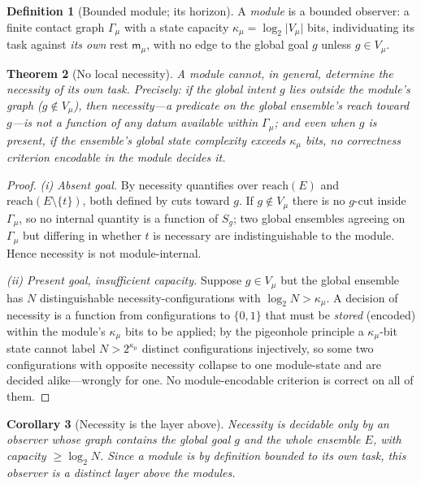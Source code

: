\documentclass[twocolumn,11pt,a4paper]{article}
\theoremstyle{sup}
\newtheorem{theorem}{Theorem}[section]
\newtheorem{corollary}[theorem]{Corollary}
\theoremstyle{definition}
\newtheorem{definition}[theorem]{Definition}
\theoremstyle{remark}
\newcommand{\reach}{\mathrm{reach}}   %
\newcommand{\med}{\mathsf{m}}         %
\newcommand{\Sent}{S}                 %
\newcommand{\task}{t}
\newcommand{\Ens}{E}                  %
\newcommand{\modu}{\mu}               %
\newcommand{\abs}[1]{\lvert#1\rvert}
\newcommand{\set}[1]{\{#1\}}
\begin{document}
\begin{definition}[Bounded module; its horizon]
\label{def:bounded}
A \emph{module} is a bounded observer: a finite contact graph $\Gamma_\modu$ with
a state capacity $\kappa_\modu=\log_2\abs{V_\modu}$ bits, individuating its task
against \emph{its own} rest $\med_\modu$, with no edge to the global goal $g$
unless $g\in V_\modu$.
\end{definition}

\begin{theorem}[No local necessity]
\label{thm:nolocal}
A module cannot, in general, determine the necessity of its own task. Precisely:
if the global intent $g$ lies outside the module's graph
($g\notin V_\modu$), then necessity---a predicate on the global ensemble's reach
toward $g$---is not a function of any datum available within $\Gamma_\modu$; and
even when $g$ is present, if the ensemble's global state complexity exceeds
$\kappa_\modu$ bits, no correctness criterion encodable in the module decides it.
\end{theorem}

\begin{proof}
\emph{(i) Absent goal.} By  necessity quantifies over
$\reach(\Ens)$ and $\reach(\Ens\setminus\set\task)$, both defined by cuts toward
$g$. If $g\notin V_\modu$ there is no $g$-cut inside $\Gamma_\modu$, so no
internal quantity is a function of $\Sent_g$; two global ensembles agreeing on
$\Gamma_\modu$ but differing in whether $\task$ is necessary are indistinguishable
to the module. Hence necessity is not module-internal.

\emph{(ii) Present goal, insufficient capacity.} Suppose $g\in V_\modu$ but the
global ensemble has $N$ distinguishable necessity-configurations with $\log_2
N>\kappa_\modu$. A decision of necessity is a function from configurations to
$\set{0,1}$ that must be \emph{stored} (encoded) within the module's
$\kappa_\modu$ bits to be applied; by the pigeonhole principle a $\kappa_\modu$-bit
state cannot label $N>2^{\kappa_\modu}$ distinct configurations injectively, so
some two configurations with opposite necessity collapse to one module-state and
are decided alike---wrongly for one. No module-encodable criterion is correct on
all of them.
\end{proof}

\begin{corollary}[Necessity is the layer above]
\label{cor:above}
Necessity is decidable only by an observer whose graph contains the global goal
$g$ and the whole ensemble $\Ens$, with capacity $\ge\log_2 N$. Since a module is
by definition bounded to its own task, this observer is a distinct layer
\emph{above} the modules.
\end{corollary}
\end{document}
